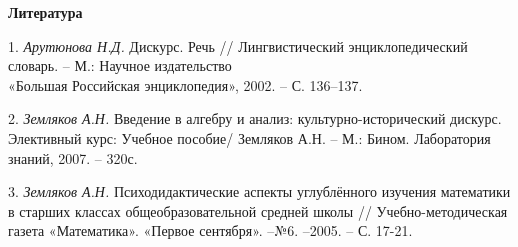 \smallskip \centerline {\bf Литература} \nopagebreak


1. {\it Арутюнова Н.Д.} Дискурс. Речь // Лингвистический энциклопедический словарь. – М.: Научное издательство \\«Большая Российская энциклопедия», 2002. – С. 136–137.

2. {\it Земляков А.Н.} Введение в алгебру и анализ: культур\-но-исторический дискурс. Элективный курс: Учебное пособие/ Земляков А.Н. – М.: Бином. Лаборатория знаний, 2007. – 320с.

3. {\it Земляков А.Н.} Психодидактические аспекты углублённого изучения математики в старших классах общеобразовательной средней школы // Учебно-методическая газета «Математика». «Первое сентября». –№6. –2005. – С. 17-21.
